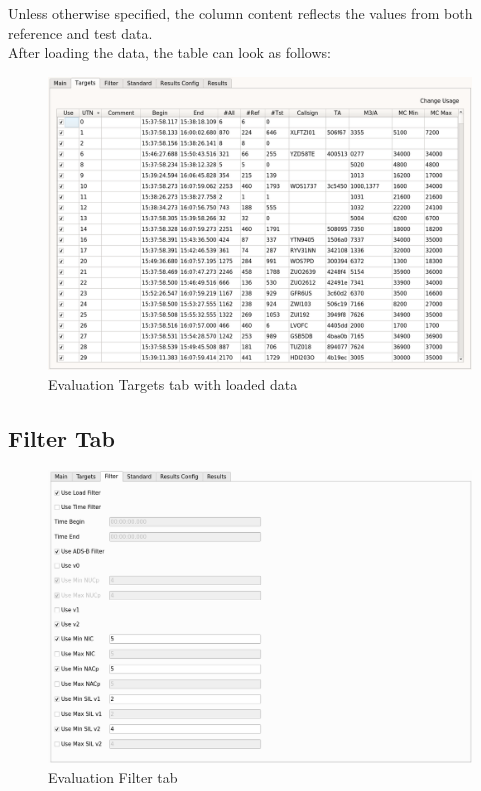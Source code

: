 Unless otherwise specified, the column content reflects the values from both reference and test data. \\

After loading the data, the table can look as follows:

\begin{figure}[H]
  \hspace*{-2cm}
    \includegraphics[width=18cm,frame]{figures/eval_targets_loaded.png}
  \caption{Evaluation Targets tab with loaded data}
\end{figure}



\subsection{Filter Tab}

\begin{figure}[H]
  \hspace*{-2cm}
    \includegraphics[width=18cm,frame]{figures/eval_filter.png}
  \caption{Evaluation Filter tab}
\end{figure}

